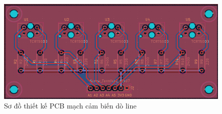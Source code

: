             \begin{figure}[H]
                \centering
                \includegraphics[width=1\textwidth]{pictures/chapter4/c4_p11_SensorPCB.png}
                \caption{Sơ đồ thiết kế PCB mạch cảm biến dò line}
                \label{fig:4-16}
            \end{figure}
